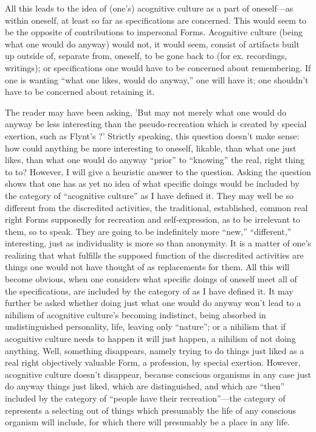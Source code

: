 All this leads to the idea of (one's) acognitive culture as a part of oneself---as within oneself, at least so far as specifications are concerned. This would seem to be the opposite of contributions to impersonal Forms. Acognitive culture (being what one would do anyway) would not, it would seem, consist of artifacts built up outside of, separate from, oneself, to be gone back to (for ex. recordings, writings); or specifications one would have to be concerned about remembering. If one is wanting \enquote{what one likes, would do anyway,} one will have it; one shouldn't have to be concerned about retaining it.

The reader may have been asking, 'But may not merely what one would do anyway be less interesting than the pseudo-recreation which is created by special exertion, such as Flynt's ?' Strictly speaking, this question doesn't make sense: how could anything be more interesting to oneself, likable, than what one just likes, than what one would do anyway \enquote{prior} to \enquote{knowing} the real, right thing to to? However, I will give a heuristic answer to the question. Asking the question shows that one has as yet no idea of what specific doings would be included by the category of \enquote{acognitive culture} as I have defined it. They may well be so different from the discredited activities, the traditional, established, common real right Forms supposedly for recreation and self-expression, as to be irrelevant to them, so to speak. They are going to be indefinitely more \enquote{new,} \enquote{different,} interesting, just as individuality is more so than anonymity. It is a matter of one's realizing that what fulfills the supposed function of the discredited activities are things one would not have thought of as replacements for them. All this will become obvious, when one considers what specific doings of oneself meet all of the specifications, are included by the category of  as I have defined it. It may further be asked whether doing just what one would do anyway won't lead to a nihilism of acognitive culture's becoming indistinct, being absorbed in undistinguished personality, life, leaving only \enquote{nature}; or a nihilism that if acognitive culture needs to happen it will just happen, a nihilism of not doing anything. Well, something disappears, namely trying to do things just liked as a real right objectively valuable Form, a profession, by special exertion. However, acognitive culture doesn't disappear, because conscious organisms in any case just do anyway things just liked, which are distinguished, and which are \enquote{then} included by the category of  \enquote{people have their recreation}---the category of  represents a selecting out of things which presumably the life of any conscious organism will include, for which there will presumably be a place in any life.

